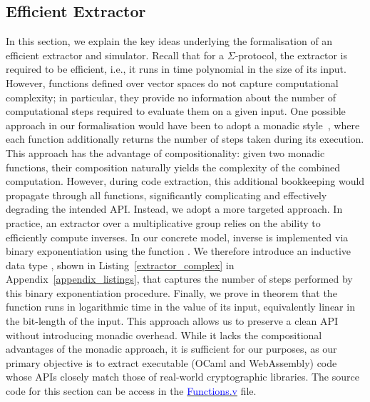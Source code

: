 \documentclass[sigconf,anonymous,review]{acmart}
\begin{document}
\subsection{Efficient Extractor}\label{eff_extractor}
In this section, we explain the key ideas underlying the formalisation of an efficient extractor and simulator. Recall that for a $\Sigma$-protocol, the extractor is required to be efficient, i.e., it runs in time polynomial in the size of its input. However, functions defined over vector spaces do not capture computational complexity; in particular, they provide no information about the number of computational steps required to evaluate them on a given input. One possible approach in our formalisation would have been to adopt a monadic style~\cite{10.1145/3473585,10.1145/3158124}, where each function additionally returns the number of steps taken during its execution. This approach has the advantage of compositionality: given two monadic functions, their composition naturally yields the complexity of the combined computation. However, during code extraction, this additional bookkeeping would propagate through all functions, significantly complicating and effectively degrading the intended API. Instead, we adopt a more targeted approach. In practice, an extractor over a multiplicative group relies on the ability to efficiently compute inverses. In our concrete model, inverse is implemented via binary exponentiation using the function \texttt{}. We therefore introduce an inductive data type \texttt{}, shown in Listing~\ref{extractor_complex} in Appendix~\ref{appendix_listings}, that captures the number of steps performed by this binary exponentiation procedure. Finally, we prove in theorem \texttt{} that the function \texttt{} runs in logarithmic time in the value of its input, equivalently linear in the bit-length of the input. This approach allows us to preserve a clean API without introducing monadic overhead. While it lacks the compositional advantages of the monadic approach, it is sufficient for our purposes, as our primary objective is to extract executable (OCaml and WebAssembly) code whose APIs closely match those of real-world cryptographic libraries. The source code for this section can be access in the \href{https://anonymous.4open.science/r/SigmaProtocol-EBA5/src/Utility/Functions.v}{\textcolor{blue}{Functions.v}} file.
\end{document}
